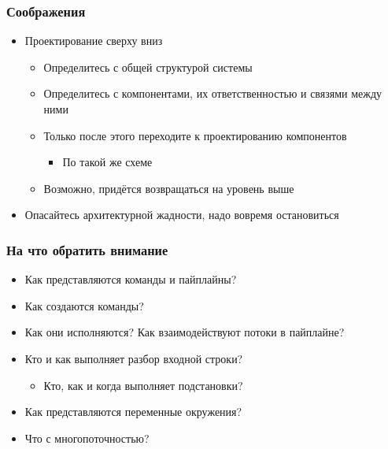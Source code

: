 \documentclass[xetex,mathserif,serif]{beamer}
\begin{document}
    \begin{frame}
        \frametitle{Соображения}
        \begin{itemize}
            \item Проектирование сверху вниз
            \begin{itemize}
                \item Определитесь с общей структурой системы
                \item Определитесь с компонентами, их ответственностью и связями между ними
                \item Только после этого переходите к проектированию компонентов
                \begin{itemize}
                    \item По такой же схеме
                \end{itemize}
                \item Возможно, придётся возвращаться на уровень выше
            \end{itemize}
            \item Опасайтесь архитектурной жадности, надо вовремя остановиться
        \end{itemize}
    \end{frame}

    \begin{frame}
        \frametitle{На что обратить внимание}
        \begin{itemize}
            \item Как представляются команды и пайплайны?
            \item Как создаются команды?
            \item Как они исполняются? Как взаимодействуют потоки в пайплайне?
            \item Кто и как выполняет разбор входной строки?
            \begin{itemize}
                \item Кто, как и когда выполняет подстановки?
            \end{itemize}
            \item Как представляются переменные окружения?
            \item Что с многопоточностью?
        \end{itemize}
    \end{frame}
\end{document}
